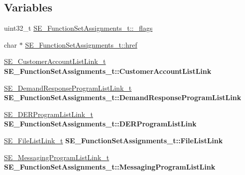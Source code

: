 \subsection*{Variables}
\begin{DoxyCompactItemize}
\item 
uint32\+\_\+t \hyperlink{group__FunctionSetAssignments_ga43199a4b6deab506dfea455cbd110bb1}{S\+E\+\_\+\+Function\+Set\+Assignments\+\_\+t\+::\+\_\+flags}
\item 
char $\ast$ \hyperlink{group__FunctionSetAssignments_ga46858e8380281930bb14b6366e53b409}{S\+E\+\_\+\+Function\+Set\+Assignments\+\_\+t\+::href}
\item 
\mbox{\label{group__FunctionSetAssignments_gaafb163e95285e6fc59286c8b9321f353}} 
\hyperlink{structSE__CustomerAccountListLink__t}{S\+E\+\_\+\+Customer\+Account\+List\+Link\+\_\+t} {\bfseries S\+E\+\_\+\+Function\+Set\+Assignments\+\_\+t\+::\+Customer\+Account\+List\+Link}
\item 
\mbox{\label{group__FunctionSetAssignments_gac1e69326d371da1b8e7e8f0c1e8ed24a}} 
\hyperlink{structSE__DemandResponseProgramListLink__t}{S\+E\+\_\+\+Demand\+Response\+Program\+List\+Link\+\_\+t} {\bfseries S\+E\+\_\+\+Function\+Set\+Assignments\+\_\+t\+::\+Demand\+Response\+Program\+List\+Link}
\item 
\mbox{\label{group__FunctionSetAssignments_ga9e1b14098fc986b016c7f0c4b97afc6e}} 
\hyperlink{structSE__DERProgramListLink__t}{S\+E\+\_\+\+D\+E\+R\+Program\+List\+Link\+\_\+t} {\bfseries S\+E\+\_\+\+Function\+Set\+Assignments\+\_\+t\+::\+D\+E\+R\+Program\+List\+Link}
\item 
\mbox{\label{group__FunctionSetAssignments_ga13eee09714e9c595cb22da32d62c271a}} 
\hyperlink{structSE__FileListLink__t}{S\+E\+\_\+\+File\+List\+Link\+\_\+t} {\bfseries S\+E\+\_\+\+Function\+Set\+Assignments\+\_\+t\+::\+File\+List\+Link}
\item 
\mbox{\label{group__FunctionSetAssignments_gaf1b12c511d11db62e8392a98e3833356}} 
\hyperlink{structSE__MessagingProgramListLink__t}{S\+E\+\_\+\+Messaging\+Program\+List\+Link\+\_\+t} {\bfseries S\+E\+\_\+\+Function\+Set\+Assignments\+\_\+t\+::\+Messaging\+Program\+List\+Link}

\end{DoxyCompactItemize}
